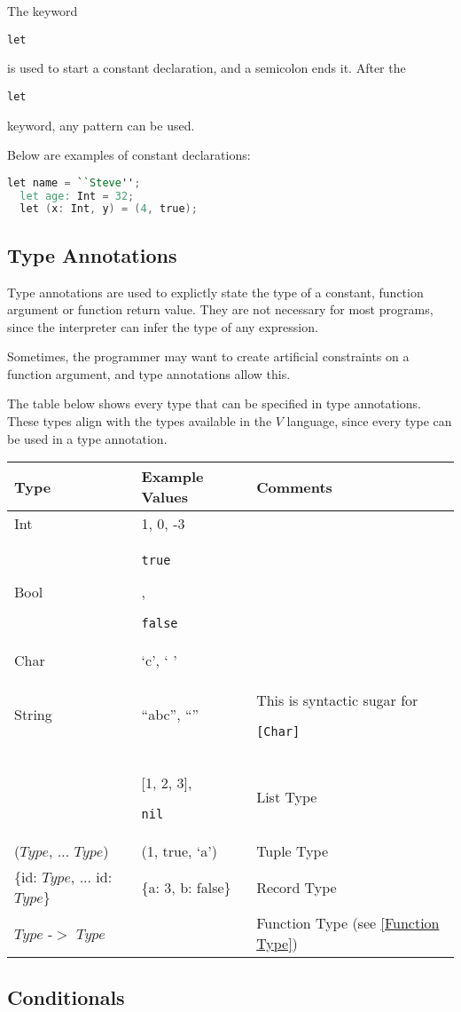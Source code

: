 \documentclass{article}
\def\code#1{\begin{footnotesize}\texttt{#1}\end{footnotesize}}
\begin{document}
The keyword \code{let} is used to start a constant declaration, and a semicolon ends it.
After the \code{let} keyword, any pattern can be used.

Below are examples of constant declarations:

\begin{lstlisting}[language=V]
  let name = ``Steve'';
  let age: Int = 32;
  let (x: Int, y) = (4, true);
\end{lstlisting}

\subsection{Type Annotations}

Type annotations are used to explictly state the type of a constant, function argument or function return value.
They are not necessary for most programs, since the interpreter can infer the type of any expression.

Sometimes, the programmer may want to create artificial constraints on a function argument, and type annotations allow this.

The table below shows every type that can be specified in type annotations.
These types align with the types available in the $V$ language, since every type can be used in a type annotation.

\begin{tabular}{|l|l|l|}
  \hline
  \textbf{Type} & \textbf{Example Values} & \textbf{Comments}\\
  \hline
  Int & 1, 0, -3 &\\
  \hline
  Bool & \code{true}, \code{false} &\\
  \hline
  Char & `c', ` ' &\\
  \hline
  String & ``abc'', ``'' & This is syntactic sugar for \code{[Char]}\\
  \hline
  [$Type$] & [1, 2, 3], \code{nil} & List Type\\
  \hline
  ($Type$, ... $Type$) & (1, true, `a') & Tuple Type\\
  \hline
  \{id: $Type$, ... id: $Type$\} & \{a: 3, b: false\} & Record Type\\
  \hline
  $Type$ -$>$ $Type$ & & Function Type (see \ref{Function Type})\\
  \hline
\end{tabular}

\subsection{Conditionals}
\end{document}
